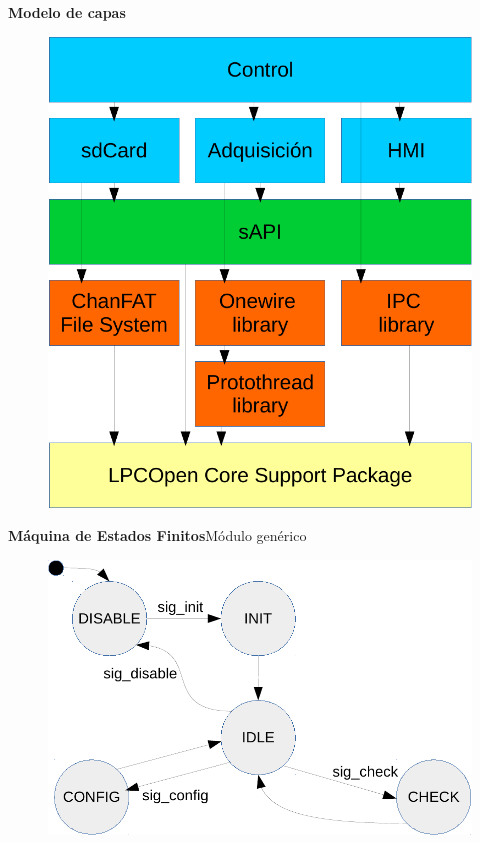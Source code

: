 \documentclass[11pt]{beamer}
\begin{document}
\begin{frame}{\textbf{\LARGE{Modelo de capas}}}
	\vspace{-.7cm}
	\begin{figure}[H]
		\includegraphics[height=.8\textheight]{./imagenes/capas.pdf}
	\end{figure}	
\end{frame}

\begin{frame}{\textbf{\LARGE{Máquina de Estados Finitos}}}{Módulo genérico}
	\vspace{-1.1cm}
	\begin{figure}[H]
		\includegraphics[height=.8\textheight]{./imagenes/MEF_generica.pdf}
	\end{figure}	
\end{frame}
\end{document}
